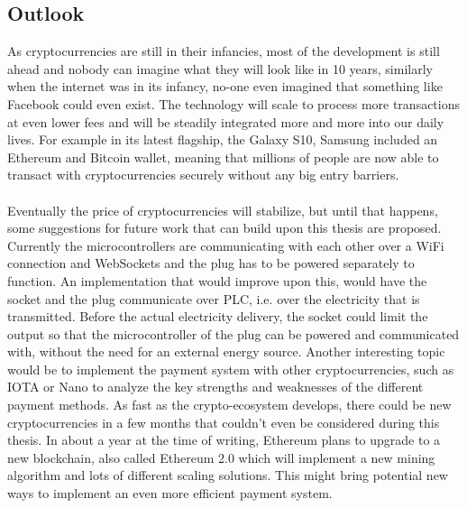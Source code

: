 \subsection{Outlook}
As cryptocurrencies are still in their infancies, most of the development is still ahead and nobody can imagine what they will look like in 10 years, similarly when the internet was in its infancy, no-one even imagined that something like Facebook could even exist.
The technology will scale to process more transactions at even lower fees and will be steadily integrated more and more into our daily lives.
For example in its latest flagship, the Galaxy S10, Samsung included an Ethereum and Bitcoin wallet, meaning that millions of people are now able to transact with cryptocurrencies securely without any big entry barriers.
\\\\
Eventually the price of cryptocurrencies will stabilize, but until that happens, some suggestions for future work that can build upon this thesis are proposed.
Currently the microcontrollers are communicating with each other over a WiFi connection and WebSockets and the plug has to be powered separately to function.
An implementation that would improve upon this, would have the socket and the plug communicate over PLC, i.e. over the electricity that is transmitted.
Before the actual electricity delivery, the socket could limit the output so that the microcontroller of the plug can be powered and communicated with, without the need for an external energy source.
Another interesting topic would be to implement the payment system with other cryptocurrencies, such as IOTA or Nano to analyze the key strengths and weaknesses of the different payment methods.
As fast as the crypto-ecosystem develops, there could be new cryptocurrencies in a few months that couldn’t even be considered during this thesis.
In about a year at the time of writing, Ethereum plans to upgrade to a new blockchain, also called Ethereum 2.0\cite{eth-2} which will implement a new mining algorithm and lots of different scaling solutions.
This might bring potential new ways to implement an even more efficient payment system.